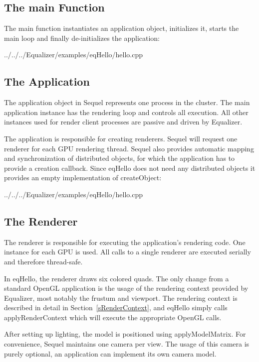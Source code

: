 \documentclass[10pt,a4]{scrartcl}
\newcommand{\sref}[1]{Section~\ref{#1}}
\begin{document}
\subsection{The main Function}

The main function instantiates an application object, initializes it, starts the
main loop and finally de-initializes the application:

{\footnotesize
  {../../../Equalizer/examples/eqHello/hello.cpp}}

\subsection{The Application}

The application object in Sequel represents one process in the cluster. The main
application instance has the rendering loop and controls all execution. All
other instances used for render client processes are passive and driven by
Equalizer.

The application is responsible for creating renderers. Sequel will request one
renderer for each GPU rendering thread. Sequel also provides automatic mapping
and synchronization of distributed objects, for which the application has to
provide a creation callback. Since \textsf{eqHello} does not need any
distributed objects it provides an empty implementation of
\textsf{createObject}:

{\footnotesize
  {../../../Equalizer/examples/eqHello/hello.cpp}}

\subsection{The Renderer}

The renderer is responsible for executing the application's rendering code. One
instance for each GPU is used. All calls to a single renderer are executed
serially and therefore thread-safe.

In \textsf{eqHello}, the renderer draws six colored quads. The only change from
a standard OpenGL application is the usage of the rendering context provided by
Equalizer, most notably the frustum and viewport. The rendering context is
described in detail in \sref{sRenderContext}, and \textsf{eqHello} simply calls
\textsf{applyRenderContext} which will execute the appropriate OpenGL calls.

After setting up lighting, the model is positioned using
\textsf{applyModelMatrix}. For convenience, Sequel maintains one camera per
view. The usage of this camera is purely optional, an application can implement
its own camera model.
\end{document}

